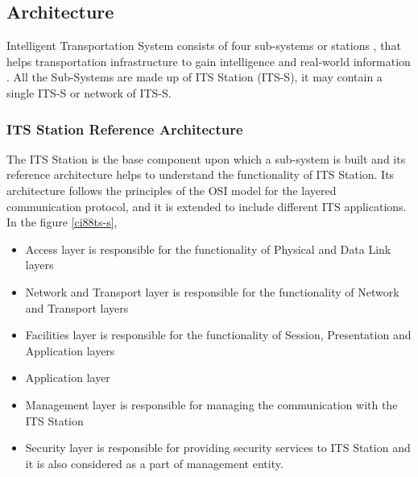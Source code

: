 \subsection{Architecture}
Intelligent Transportation System consists of four sub-systems or stations \cite{etsi}, that helps transportation infrastructure to gain intelligence and real-world information . All the Sub-Systems are made up of ITS Station (ITS-S), it may contain a single ITS-S or network of ITS-S. 

\subsubsection{ITS Station Reference Architecture}
The ITS Station is the base component upon which a sub-system is built and its reference architecture helps to understand the functionality of ITS Station. Its architecture follows the principles of the OSI model\cite{OSI} for the layered communication protocol, and it is extended to include different ITS applications. In the figure \ref{ci88ts-s},

\begin{itemize}
\item Access layer is responsible for the functionality of Physical and Data Link layers
\item Network and Transport layer is responsible for the functionality of  Network and Transport layers
\item Facilities layer is responsible for the functionality of Session, Presentation and Application layers
\item Application layer
\item Management layer is responsible for managing the communication with the ITS Station
\item Security layer is responsible for providing security services to ITS Station and it is also considered as a part of  management entity.
\end{itemize}


